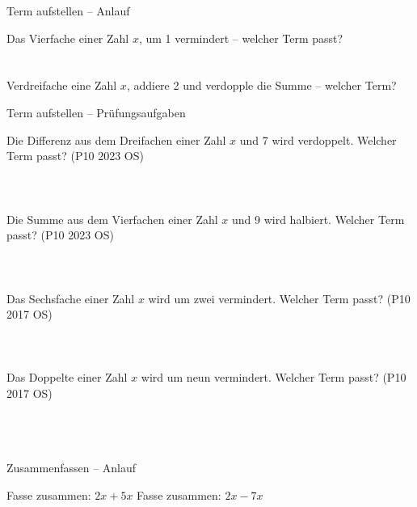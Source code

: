 \setcounter{aufgabe}{60}

\begin{aufgabe}{Term aufstellen – Anlauf}
\begin{teile}
\teil Das Vierfache einer Zahl $x$, um 1 vermindert – welcher Term passt? \\  \\  \\ 
\teil Verdreifache eine Zahl $x$, addiere 2 und verdopple die Summe – welcher Term? \leerfeld
\end{teile}
\end{aufgabe}

\begin{aufgabe}{Term aufstellen – Prüfungsaufgaben}
\begin{teile}
\teil Die Differenz aus dem Dreifachen einer Zahl $x$ und 7 wird verdoppelt. Welcher Term passt? \hfill (P10 2023 OS) \\  \\  \\  \\ 
\teil Die Summe aus dem Vierfachen einer Zahl $x$ und 9 wird halbiert. Welcher Term passt? \hfill (P10 2023 OS) \\  \\  \\  \\ 
\teil Das Sechsfache einer Zahl $x$ wird um zwei vermindert. Welcher Term passt? \hfill (P10 2017 OS) \\  \\  \\  \\ 
\teil Das Doppelte einer Zahl $x$ wird um neun vermindert. Welcher Term passt? \hfill (P10 2017 OS) \\  \\  \\  \\ 
\end{teile}
\end{aufgabe}

\begin{aufgabe}{Zusammenfassen – Anlauf}
\begin{teile}
\teil Fasse zusammen: $2x + 5x$ \leerfeld
\teil Fasse zusammen: $2x - 7x$ \leerfeld
\end{teile}
\end{aufgabe}


